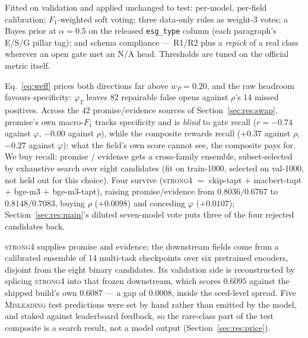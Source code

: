  Fitted on validation and applied unchanged to test: per-model, per-field
calibration; $F_1$-weighted soft voting; three data-only rules as weight-3 votes; a Bayes prior
at $\alpha{=}0.5$ on the released \texttt{esg\_type} column (each paragraph's E/S/G pillar tag);
and schema compliance --- R1/R2 plus a
\emph{repick} of a real class wherever an open gate met an N/A head. Thresholds are tuned on the
official metric itself.

 Eq.~\eqref{eq:weff} prices both directions far above $w_P{=}0.20$,
and the raw headroom favours specificity: $\varphi_T$ leaves 82 repairable false opens against
$\rho$'s 14 missed positives. Across the 42 promise/evidence sources of
Section~\ref{sec:res:swap}, promise's own macro-$F_1$ tracks specificity and is \emph{blind} to
gate recall ($r{=}{-}0.74$ against $\varphi$, ${-}0.00$ against $\rho$), while the composite
rewards recall ($+0.37$ against $\rho$, $-0.27$ against $\varphi$): what the field's own score
cannot see, the composite pays for. We buy recall: promise / evidence gets a
cross-family ensemble, subset-selected by exhaustive search over eight candidates (fit on
train-1000, selected on val-1000, not held out for this choice). Four survive (\textsc{strong4} $=$ ckip-tapt $+$ macbert-tapt $+$ bge-m3 $+$
bge-m3-tapt), raising promise/evidence from $0.8036/0.6767$ to $0.8148/0.7083$, buying
$\rho$ ($+0.0098$) and conceding $\varphi$ ($+0.0107$);
Section~\ref{sec:res:main}'s diluted seven-model vote puts three of the four rejected candidates
back.

 \textsc{strong4} supplies promise and evidence; the downstream
fields come from a calibrated ensemble of 14 multi-task checkpoints over six pretrained encoders,
disjoint from the eight binary candidates. Its validation side is reconstructed by splicing
\textsc{strong4} into that frozen downstream, which scores $0.6095$ against the shipped build's
own $0.6087$ --- a gap of $0.0008$, inside the seed-level spread. Five \textsc{Misleading} test
predictions were set by hand rather than emitted by the model, and staked against leaderboard
feedback, so the rare-class part of the test composite is a search result, not a model output
(Section~\ref{sec:res:price}).

